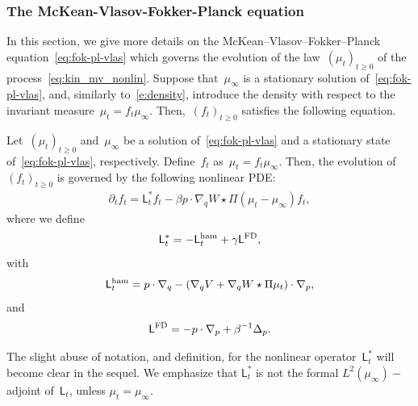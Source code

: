\documentclass[onefignum,onetabnum]{siamart251216} %
\renewcommand{\geq}{\geqslant}
\newcommand{\mescin}{\mu}
\newcommand{\projp}{\Pi}
\newcommand{\gennonlin}[1]{\mathsf{L}_{#1}}
\newcommand{\Lham}{\mathsf{L}^{\rm{ham}}}
\newcommand{\LFD}{\mathsf{L}^{\rm{FD}}}
\theoremstyle{plain}
\numberwithin{equation}{section}
\numberwithin{theorem}{section}
\begin{document}
\subsubsection{The McKean-Vlasov-Fokker-Planck equation}
\label{sec:vfp_eq}
In this section, we give more details on the McKean--Vlasov--Fokker--Planck equation~\eqref{eq:fok-pl-vlas} which governs the evolution of the law~$(\mescin_t)_{t \geq 0}$ of the process~\eqref{eq:kin_mv_nonlin}.
Suppose that~$\mescin_\infty$ is a stationary solution of~\eqref{eq:fok-pl-vlas},
and, similarly to~\eqref{e:density}, introduce the density with respect to the invariant measure~$\mescin_t = f_t\mescin_\infty$.
Then,~$(f_t)_{t \geq 0}$ satisfies the following equation.
\begin{lemma}
    Let~$(\mescin_t)_{t\geq0}$ and~$\mescin_\infty$ be a solution of~\eqref{eq:fok-pl-vlas} and a stationary state of~\eqref{eq:fok-pl-vlas}, respectively. Define~$f_t$ as~$\mescin_t = f_t\mescin_\infty$. Then, the evolution of $(f_t)_{t \geq 0}$ is governed by the following nonlinear PDE:
    \begin{align}
    \label{eq:backward_vlas_fok_planck}
    \partial_t f_t =  \gennonlin{t}^* f_t -  \beta p\cdot\nabla_q W \star \projp (\mescin_t - \mescin_\infty) f_t,
\end{align}
where we define
\begin{align}
    \label{eq:generator_nonlin}
    \gennonlin{t}^* = -\Lham_t + \gamma\LFD,
\end{align}
with
\begin{align*}
    \Lham_t = p\cdot \nabla_q - (\nabla_q V+ \nabla_q W \star \projp \mescin_t) \cdot \nabla_p,
\end{align*}
and
\begin{align}
    \label{eq:def_LFD}
    \LFD = -p\cdot\nabla_p + \beta^{-1}\Delta_p.
\end{align}
\end{lemma}
The slight abuse of notation, and definition, for the nonlinear operator~$\gennonlin{t}^*$ will become clear in the sequel.
We emphasize that $\gennonlin{t}^*$ is not the formal $L^2(\mu_{\infty})-$adjoint of~$\gennonlin{t}$,
unless $\mu_t = \mu_{\infty}$.
\end{document}
